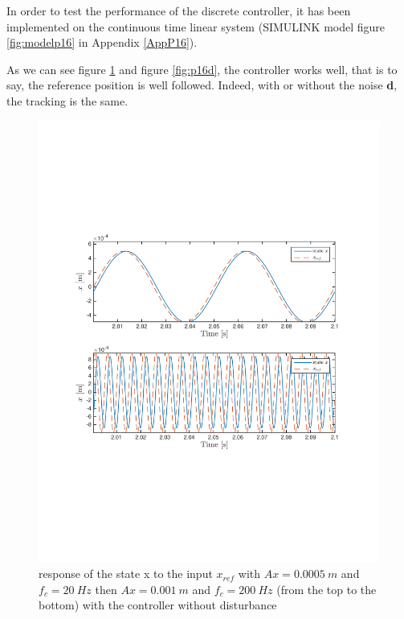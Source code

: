 In order to test the performance of the discrete controller, it has been implemented on the continuous time linear system (SIMULINK model figure \ref{fig:modelp16} in Appendix \ref{AppP16}).

As we can see figure \ref{fig:p16d0} and figure \ref{fig:p16d}, the controller works well, that is to say, the reference position is well followed. Indeed, with or without the noise \textbf{d}, the tracking is the same.

\begin{figure}[H]
 \centering 
 \includegraphics[trim=2cm 7cm 2cm 7cm, clip=true, totalheight=0.35\textheight, angle=0]{figures/p16d0.pdf}
 \caption{response of the state x to the input $x_{ref}$ with $Ax = 0.0005\ m$ and $f_c = 20\ Hz$ then $Ax = 0.001\ m$ and $f_c = 200\ Hz$ (from the top to the bottom) with the controller without disturbance}
 \label{fig:p16d0}
\end{figure}

